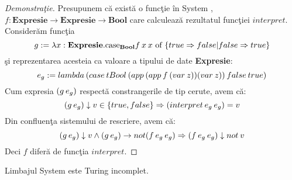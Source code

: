 \begin{proof}[Demonstra\c tie]
Presupunem c\u a exist\u a o func\c tie \^ in System \fhat, $f : \textbf{Expresie} \to \textbf{Expresie} \to \textbf{Bool}$ care calculeaz\u a rezultatul func\c tiei $interpret$. Consider\u am func\c tia
$$ g := \lambda x : \textbf{Expresie}. \text{case}_{\textbf{Bool}} f\hspace{2pt} x\hspace{2pt} x \text{ of } \{ true \Rightarrow false | false \Rightarrow true \} $$
\c si reprezentarea acesteia ca valoare a tipului de date \textbf{Expresie}:
$$ e_g := lambda\hspace{2pt} (case\hspace{2pt} tBool \hspace{2pt}  (app\hspace{2pt} (app\hspace{2pt} f\hspace{2pt} (var\hspace{2pt} z)) (var\hspace{2pt} z))\hspace{2pt} false\hspace{2pt} true ) $$
Cum expresia $(g\hspace{2pt} e_g)$ respect\u a constrangerile de tip cerute, avem c\u a:
$$ (g\hspace{2pt} e_g) \downarrow v \in \{true, false\} \Rightarrow (interpret\hspace{2pt} e_g\hspace{2pt} e_g) = v $$
Din confluen\c ta sistemului de rescriere, avem c\u a:
$$ (g\hspace{2pt} e_g) \downarrow v \wedge (g\hspace{2pt} e_g) \to not(f\hspace{2pt} e_g\hspace{2pt} e_g) \Rightarrow (f\hspace{2pt} e_g\hspace{2pt} e_g) \downarrow not\hspace{2pt} v $$
Deci $f$ difer\u a de func\c tia $interpret$.
\done{}
\end{proof}

\begin{corollary}
Limbajul System \fhat este Turing incomplet.
\end{corollary}

